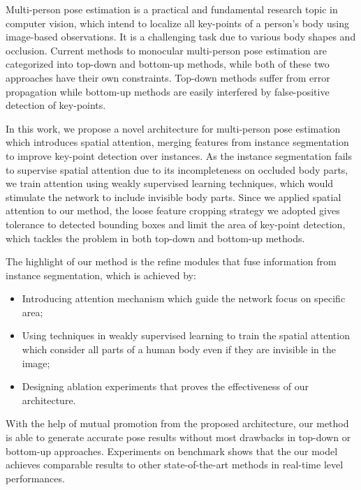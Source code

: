 \begin{eabstract}
Multi-person pose estimation is a practical and fundamental research topic in computer vision, which intend to localize all key-points of a person's body using image-based observations. It is a challenging task due to various body shapes and occlusion. Current methods to monocular multi-person pose estimation are categorized into top-down and bottom-up methods, while both of these two approaches have their own constraints. Top-down methods suffer from error propagation while bottom-up methods are easily interfered by false-positive detection of key-points.

In this work, we propose a novel architecture for multi-person pose estimation which introduces spatial attention, merging features from instance segmentation to improve key-point detection over instances. As the instance segmentation fails to supervise spatial attention due to its incompleteness on occluded body parts, we train attention using weakly supervised learning techniques, which would stimulate the network to include invisible body parts. Since we applied spatial attention to our method, the loose feature cropping strategy we adopted gives tolerance to detected bounding boxes and limit the area of key-point detection, which tackles the problem in both top-down and bottom-up methods.

The highlight of our method is the refine modules that fuse information from instance segmentation, which is achieved by:
\begin{itemize}
	\item Introducing attention mechanism which guide the network focus on specific area;
	\item Using techniques in weakly supervised learning to train the spatial attention which consider all parts of a human body even if they are invisible in the image;
	\item Designing ablation experiments that proves the effectiveness of our architecture.
\end{itemize}

With the help of mutual promotion from the proposed architecture, our method is able to generate accurate pose results without most drawbacks in top-down or bottom-up approaches. Experiments on benchmark shows that the our model achieves comparable results to other state-of-the-art methods in real-time level performances.
\end{eabstract}

